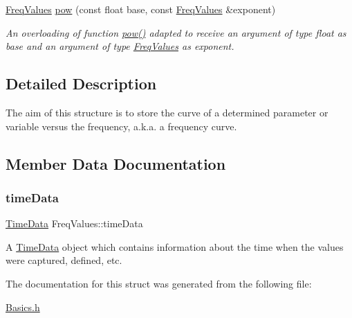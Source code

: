 \begin{DoxyCompactItemize}
\mbox{\label{structFreqValues_a4a50ddd9aa3d48c0b3da456ca07551a5}} 
\hyperlink{structFreqValues}{Freq\+Values} \hyperlink{structFreqValues_a4a50ddd9aa3d48c0b3da456ca07551a5}{pow} (const float base, const \hyperlink{structFreqValues}{Freq\+Values} \&exponent)
\begin{DoxyCompactList}\small\item\em An overloading of function {\ttfamily \hyperlink{structFreqValues_a8b8ee90b9d108ad7008a3613b31253e7}{pow()}} adapted to receive an argument of type {\itshape float} as base and an argument of type {\itshape \hyperlink{structFreqValues}{Freq\+Values}} as exponent. \end{DoxyCompactList}\end{DoxyCompactItemize}


\subsection{Detailed Description}
The aim of this structure is to store the curve of a determined parameter or variable versus the frequency, a.\+k.\+a. a frequency curve. 

\subsection{Member Data Documentation}
\mbox{\label{structFreqValues_a4c97a4710c83078f5af5d92f2bedfe61}} 
\subsubsection{\texorpdfstring{time\+Data}{timeData}}
{\footnotesize\ttfamily \hyperlink{structTimeData}{Time\+Data} Freq\+Values\+::time\+Data}

A \hyperlink{structTimeData}{Time\+Data} object which contains information about the time when the values were captured, defined, etc. 

The documentation for this struct was generated from the following file\+:\begin{DoxyCompactItemize}
\item 
\hyperlink{Basics_8h}{Basics.\+h}\end{DoxyCompactItemize}
